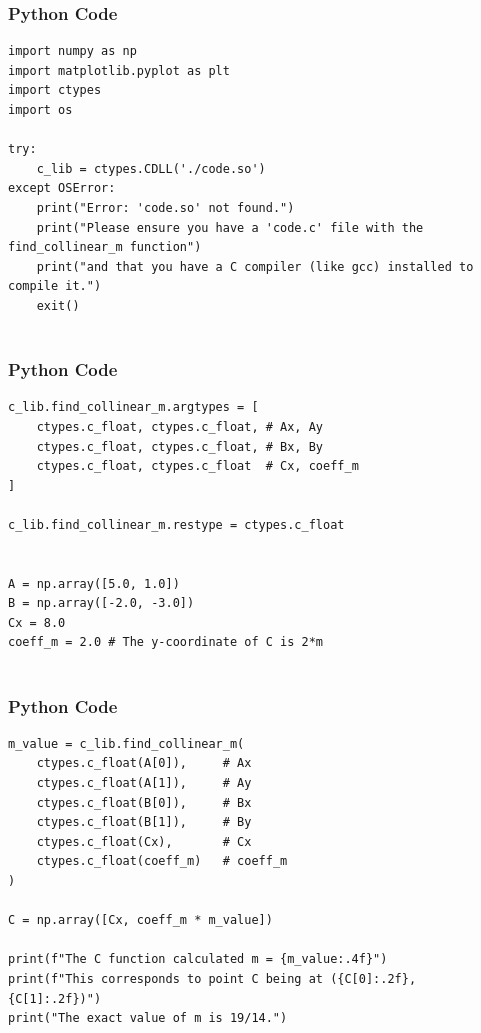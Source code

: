 \documentclass{beamer}
\begin{document}
\begin{frame}[fragile]
    \frametitle{Python Code}
    \begin{lstlisting}
import numpy as np
import matplotlib.pyplot as plt
import ctypes
import os

try:
    c_lib = ctypes.CDLL('./code.so')
except OSError:
    print("Error: 'code.so' not found.")
    print("Please ensure you have a 'code.c' file with the find_collinear_m function")
    print("and that you have a C compiler (like gcc) installed to compile it.")
    exit()


    \end{lstlisting}
\end{frame}

\begin{frame}[fragile]
    \frametitle{Python Code}
    \begin{lstlisting}
c_lib.find_collinear_m.argtypes = [
    ctypes.c_float, ctypes.c_float, # Ax, Ay
    ctypes.c_float, ctypes.c_float, # Bx, By
    ctypes.c_float, ctypes.c_float  # Cx, coeff_m
]

c_lib.find_collinear_m.restype = ctypes.c_float


A = np.array([5.0, 1.0])
B = np.array([-2.0, -3.0])
Cx = 8.0
coeff_m = 2.0 # The y-coordinate of C is 2*m


    \end{lstlisting}
\end{frame}

\begin{frame}[fragile]
    \frametitle{Python Code}
    \begin{lstlisting}
m_value = c_lib.find_collinear_m(
    ctypes.c_float(A[0]),     # Ax
    ctypes.c_float(A[1]),     # Ay
    ctypes.c_float(B[0]),     # Bx
    ctypes.c_float(B[1]),     # By
    ctypes.c_float(Cx),       # Cx
    ctypes.c_float(coeff_m)   # coeff_m
)

C = np.array([Cx, coeff_m * m_value])

print(f"The C function calculated m = {m_value:.4f}")
print(f"This corresponds to point C being at ({C[0]:.2f}, {C[1]:.2f})")
print("The exact value of m is 19/14.")
    \end{lstlisting}
\end{frame}
\end{document}
